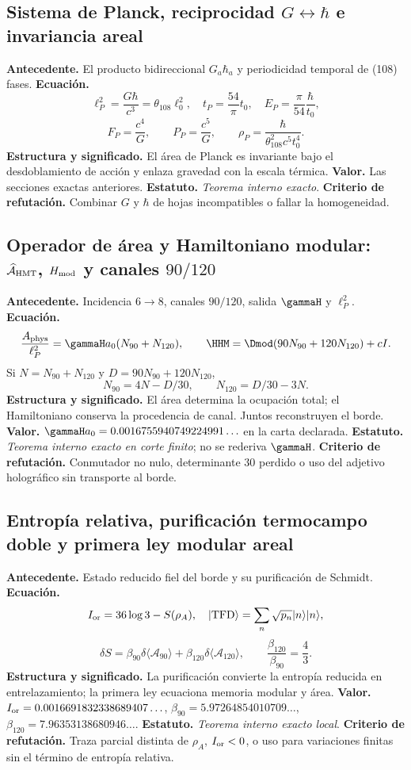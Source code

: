 \subsection*{Sistema de Planck, reciprocidad \(G\leftrightarrow\hbar\) e invariancia areal}
\textbf{Antecedente.} El producto bidireccional \(G_a\hbar_a\) y periodicidad temporal de (108) fases.
\textbf{Ecuaci\'on.}
\[
\ell_P^2=\frac{G\hbar}{c^3}=\theta_{108}\ell_0^2,
\quad t_P=\frac{54}{\pi}t_0,
\quad E_P=\frac{\pi}{54}\frac{\hbar}{t_0},
\]
\[
F_P=\frac{c^4}{G},\qquad P_P=\frac{c^5}{G},\qquad
\rho_P=\frac{\hbar}{\theta_{108}^2c^5t_0^4}.
\]
\textbf{Estructura y significado.} El \'area de Planck es invariante bajo el
desdoblamiento de acci\'on y enlaza gravedad con la escala t\'ermica.
\textbf{Valor.} Las secciones exactas anteriores.
\textbf{Estatuto.} \emph{Teorema interno exacto}. \textbf{Criterio de refutación.} Combinar
\(G\) y \(\hbar\) de hojas incompatibles o fallar la homogeneidad.

\subsection*{Operador de área y Hamiltoniano modular: \(\widehat{\mathcal A}_{\rm HMT}\), \(H_{\rm mod}\) y canales \(90/120\)}
\textbf{Antecedente.} Incidencia \(6\to8\), canales \(90/120\), salida
\(\gammaH\) y \(\ell_P^2\). \textbf{Ecuaci\'on.}
\[
\frac{A_{\rm phys}}{\ell_P^2}=\gammaH a_0(N_{90}+N_{120}),
\qquad
\HHM=\Dmod(90N_{90}+120N_{120})+cI.
\]
Si \(N=N_{90}+N_{120}\) y
\(D=90N_{90}+120N_{120}\),
\[
N_{90}=4N-D/30,\qquad N_{120}=D/30-3N.
\]
\textbf{Estructura y significado.} El \'area determina la ocupaci\'on total; el
Hamiltoniano conserva la procedencia de canal. Juntos reconstruyen el borde.
\textbf{Valor.} \(\gammaH a_0=0.0016755940749224991\ldots\) en la carta
declarada. \textbf{Estatuto.} \emph{Teorema interno exacto en corte finito}; no se
rederiva \(\gammaH\). \textbf{Criterio de refutación.} Conmutador no nulo, determinante
\(30\) perdido o uso del adjetivo hologr\'afico sin transporte al borde.

\subsection*{Entropía relativa, purificación termocampo doble y primera ley modular areal}
\textbf{Antecedente.} Estado reducido fiel del borde y su purificaci\'on de
Schmidt. \textbf{Ecuaci\'on.}
\[
I_{\rm or}=36\log3-S(\rho_A),
\quad
|\mathrm{TFD}\rangle=\sum_n\sqrt{p_n}|n\rangle|n\rangle,
\]
\[
\delta S=\beta_{90}\delta\langle \mathcal A_{90}\rangle
+\beta_{120}\delta\langle \mathcal A_{120}\rangle,
\qquad \frac{\beta_{120}}{\beta_{90}}=\frac43.
\]
\textbf{Estructura y significado.} La purificaci\'on convierte la entrop\'ia
reducida en entrelazamiento; la primera ley ecuaciona memoria modular y \'area.
\textbf{Valor.} \(I_{\rm or}=0.0016691832338689407\ldots\),
\(\beta_{90}=5.97264854010709\ldots\),
\(\beta_{120}=7.96353138680946\ldots\).
\textbf{Estatuto.} \emph{Teorema interno exacto local}. \textbf{Criterio de refutación.} Traza
parcial distinta de \(\rho_A\), \(I_{\rm or}<0\), o uso para variaciones
finitas sin el t\'ermino de entrop\'ia relativa.


